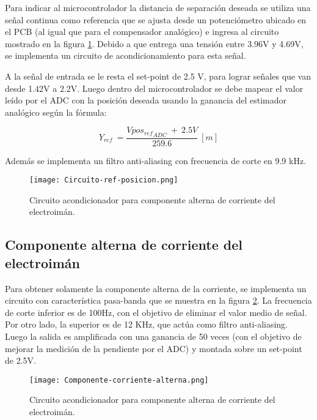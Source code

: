 \noindent Para indicar al microcontrolador la distancia de separación deseada se utiliza una señal continua como referencia que se ajusta desde un potenciómetro ubicado en el PCB (al igual que para el compensador analógico) e ingresa al circuito mostrado en la figura \ref{fig:circuito-ref-posicion}. Debido a que entrega una tensión entre 3.96V y 4.69V, se implementa un circuito de acondicionamiento para esta señal.

\noindent A la señal de entrada se le resta el set-point de 2.5 V, para lograr señales que van desde 1.42V a 2.2V. Luego dentro del microcontrolador se debe mapear el valor leído por el ADC con la posición deseada usando la ganancia del estimador analógico según la fórmula:

\begin{equation} 
	Y_{ref}\ =\frac{Vpo{s_{ref}}_{ADC}\ +\ 2.5V}{259.6}\ [m]
\end{equation}

\noindent Además se implementa un filtro anti-aliasing con frecuencia de corte en 9.9 kHz.

\begin{figure}[H]
	\centering
	\texttt{[image: Circuito-ref-posicion.png]}
	\caption{Circuito acondicionador para componente alterna de corriente del electroimán.}
	\label{fig:circuito-ref-posicion}
\end{figure}

\subsection{Componente  alterna de corriente del electroimán}

\noindent Para obtener solamente la componente alterna de la corriente, se implementa un circuito con característica pasa-banda que se muestra en la figura \ref{fig:componente-corriente-alterna}. La frecuencia de corte inferior  es de 100Hz, con el objetivo de eliminar el valor medio de señal. Por otro lado, la superior es de 12 KHz, que actúa como filtro anti-aliasing. Luego la salida es amplificada con una ganancia de 50 veces (con el objetivo de mejorar la medición de la pendiente por el ADC) y montada sobre un set-point de 2.5V.

\begin{figure}[H]
	\centering
	\texttt{[image: Componente-corriente-alterna.png]}
	\caption{ Circuito acondicionador para componente alterna de corriente del electroimán.
	}
	\label{fig:componente-corriente-alterna}
\end{figure}

